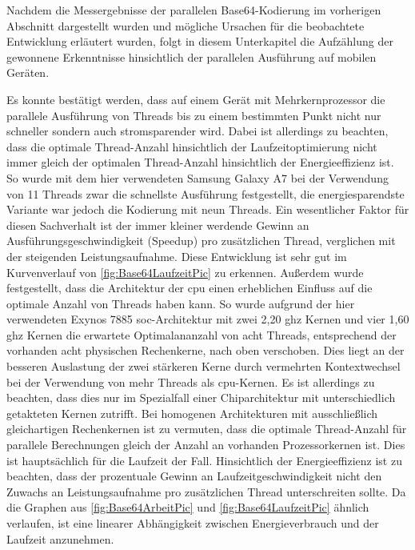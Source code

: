 Nachdem die Messergebnisse der parallelen Base64-Kodierung im vorherigen Abschnitt dargestellt wurden und mögliche Ursachen für die beobachtete Entwicklung erläutert wurden, folgt in diesem Unterkapitel die Aufzählung der gewonnene Erkenntnisse hinsichtlich der parallelen Ausführung auf mobilen Geräten.

Es konnte bestätigt werden, dass auf einem Gerät mit Mehrkernprozessor die parallele Ausführung von Threads bis zu einem bestimmten Punkt nicht nur schneller sondern auch stromsparender wird. Dabei ist allerdings zu beachten, dass die optimale Thread-Anzahl hinsichtlich der Laufzeitoptimierung nicht immer gleich der optimalen Thread-Anzahl hinsichtlich der Energieeffizienz ist. So wurde mit dem hier verwendeten Samsung Galaxy A7 bei der Verwendung von 11 Threads zwar die schnellste Ausführung festgestellt, die energiesparendste Variante war jedoch die Kodierung mit neun Threads. Ein wesentlicher Faktor für diesen Sachverhalt ist der immer kleiner werdende Gewinn an Ausführungsgeschwindigkeit (Speedup) pro zusätzlichen  Thread, verglichen mit der steigenden Leistungsaufnahme. Diese Entwicklung ist sehr gut im Kurvenverlauf von \autoref{fig:Base64LaufzeitPic} zu erkennen. Außerdem wurde festgestellt, dass die Architektur der \ac{cpu} einen erheblichen Einfluss auf die optimale Anzahl von Threads  haben kann. So wurde aufgrund der hier verwendeten Exynos 7885 \ac{soc}-Architektur mit zwei 2,20 \ac{ghz} Kernen und vier 1,60 \ac{ghz} Kernen die erwartete Optimalananzahl von acht Threads, entsprechend der vorhanden acht physischen Rechenkerne, nach oben verschoben. Dies liegt an der besseren Auslastung der zwei stärkeren Kerne durch vermehrten Kontextwechsel bei der Verwendung von mehr Threads als \ac{cpu}-Kernen. Es ist allerdings zu beachten, dass dies nur im Spezialfall einer Chiparchitektur mit unterschiedlich getakteten Kernen zutrifft. Bei homogenen Architekturen mit ausschließlich gleichartigen Rechenkernen ist zu vermuten, dass die optimale Thread-Anzahl für parallele Berechnungen gleich der Anzahl an vorhanden Prozessorkernen ist. Dies ist hauptsächlich für die Laufzeit der Fall. Hinsichtlich der Energieeffizienz ist zu beachten, dass der prozentuale Gewinn an Laufzeitgeschwindigkeit nicht den Zuwachs an Leistungsaufnahme pro zusätzlichen Thread unterschreiten sollte. Da die Graphen aus \autoref{fig:Base64ArbeitPic} und \autoref{fig:Base64LaufzeitPic} ähnlich verlaufen, ist eine linearer Abhängigkeit zwischen Energieverbrauch und der Laufzeit anzunehmen.